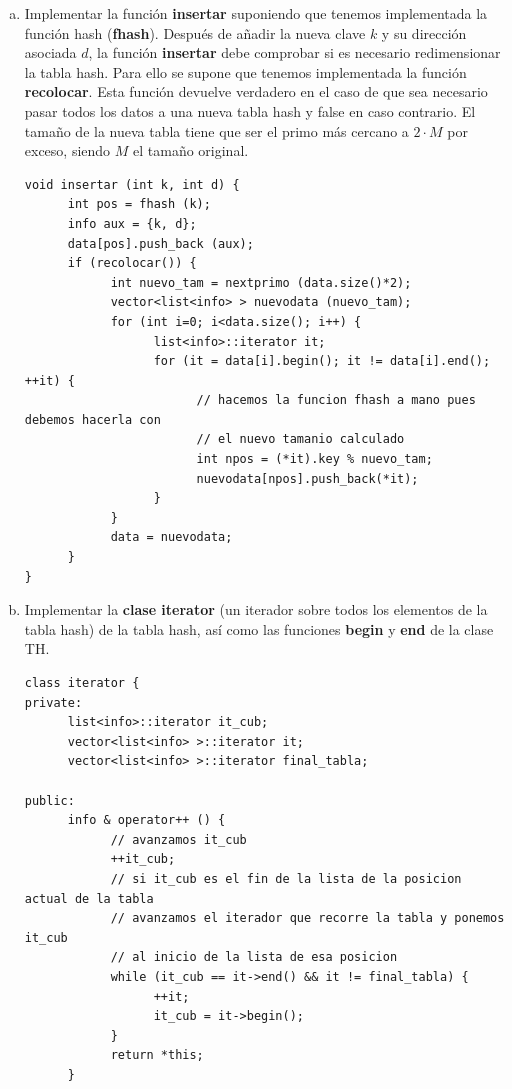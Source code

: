 \documentclass[10pt,a4paper,spanish]{report}
\begin{document}
\begin{enumerate}[a)]
      \item Implementar la función \textbf{\textcolor[rgb]{0.3,0.4,0.8}{insertar}} suponiendo que tenemos implementada la función hash (\textbf{\textcolor[rgb]{0.3,0.4,0.8}{fhash}}). Después de añadir la nueva clave $k$ y su dirección asociada $d$, la función \textbf{\textcolor[rgb]{0.3,0.4,0.8}{insertar}} debe comprobar si es necesario redimensionar la tabla hash. Para ello se supone que tenemos implementada la función \textbf{\textcolor[rgb]{0.3,0.4,0.8}{recolocar}}. Esta función devuelve verdadero en el caso de que sea necesario pasar todos los datos a una nueva tabla hash y false en caso contrario. El tamaño de la nueva tabla tiene que ser el primo más cercano a $2 \cdot M$ por exceso, siendo $M$ el tamaño original.

\begin{verbatim}
void insertar (int k, int d) {
      int pos = fhash (k);
      info aux = {k, d};
      data[pos].push_back (aux);
      if (recolocar()) {
            int nuevo_tam = nextprimo (data.size()*2);
            vector<list<info> > nuevodata (nuevo_tam);
            for (int i=0; i<data.size(); i++) {
                  list<info>::iterator it;
                  for (it = data[i].begin(); it != data[i].end(); ++it) {
                        // hacemos la funcion fhash a mano pues debemos hacerla con
                        // el nuevo tamanio calculado
                        int npos = (*it).key % nuevo_tam;
                        nuevodata[npos].push_back(*it);
                  }
            }
            data = nuevodata;
      }
}
\end{verbatim}

      \item  Implementar la \textbf{\textcolor[rgb]{0.3,0.4,0.8}{clase iterator}} (un iterador sobre todos los elementos de la tabla hash) de la tabla hash, así como las funciones \textbf{\textcolor[rgb]{0.3,0.4,0.8}{begin}} y \textbf{\textcolor[rgb]{0.3,0.4,0.8}{end}} de la clase TH.

\begin{verbatim}
class iterator {
private:
      list<info>::iterator it_cub;
      vector<list<info> >::iterator it;
      vector<list<info> >::iterator final_tabla;

public:
      info & operator++ () {
            // avanzamos it_cub
            ++it_cub;
            // si it_cub es el fin de la lista de la posicion actual de la tabla
            // avanzamos el iterador que recorre la tabla y ponemos it_cub
            // al inicio de la lista de esa posicion
            while (it_cub == it->end() && it != final_tabla) {
                  ++it;
                  it_cub = it->begin();
            }
            return *this;
      }


\end{verbatim}
\end{enumerate}
\end{document}
